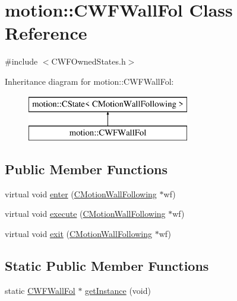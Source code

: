 \hypertarget{classmotion_1_1CWFWallFol}{}\section{motion\+:\+:C\+W\+F\+Wall\+Fol Class Reference}
\label{classmotion_1_1CWFWallFol}


{\ttfamily \#include $<$C\+W\+F\+Owned\+States.\+h$>$}

Inheritance diagram for motion\+:\+:C\+W\+F\+Wall\+Fol\+:\begin{figure}[H]
\begin{center}
\leavevmode
\includegraphics[height=2.000000cm]{classmotion_1_1CWFWallFol}
\end{center}
\end{figure}
\subsection*{Public Member Functions}
\begin{DoxyCompactItemize}
\item 
virtual void \mbox{\hyperlink{classmotion_1_1CWFWallFol_a4d0e6d05a5bc89c690f86559cbc55ecb}{enter}} (\mbox{\hyperlink{classmotion_1_1CMotionWallFollowing}{C\+Motion\+Wall\+Following}} $\ast$wf)
\item 
virtual void \mbox{\hyperlink{classmotion_1_1CWFWallFol_a089095864c2340123e6e5e5e4e08ef23}{execute}} (\mbox{\hyperlink{classmotion_1_1CMotionWallFollowing}{C\+Motion\+Wall\+Following}} $\ast$wf)
\item 
virtual void \mbox{\hyperlink{classmotion_1_1CWFWallFol_af90587d832a04a15d6c166e9b6a6afed}{exit}} (\mbox{\hyperlink{classmotion_1_1CMotionWallFollowing}{C\+Motion\+Wall\+Following}} $\ast$wf)
\end{DoxyCompactItemize}
\subsection*{Static Public Member Functions}
\begin{DoxyCompactItemize}
\item 
static \mbox{\hyperlink{classmotion_1_1CWFWallFol}{C\+W\+F\+Wall\+Fol}} $\ast$ \mbox{\hyperlink{classmotion_1_1CWFWallFol_a56dd0cbd1e50c6e845a9c944e0b9a0a9}{get\+Instance}} (void)
\end{DoxyCompactItemize}


